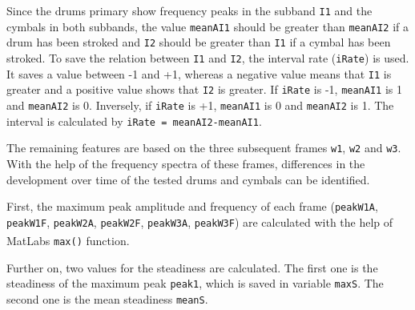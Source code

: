 Since the drums primary show frequency peaks in the subband \lstinline{I1} and the cymbals in both subbands, the value \lstinline{meanAI1} should be greater than \lstinline{meanAI2} if a drum has been stroked and \lstinline{I2} should be greater than \lstinline{I1} if a cymbal has been stroked. To save the relation between \lstinline{I1} and \lstinline{I2}, the interval rate (\lstinline{iRate}) is used. It saves a value between -1 and +1, whereas a negative value means that \lstinline{I1} is greater and a positive value shows that \lstinline{I2} is greater. If \lstinline{iRate} is -1, \lstinline{meanAI1} is 1 and \lstinline{meanAI2} is 0. Inversely, if \lstinline{iRate} is +1, \lstinline{meanAI1} is 0 and \lstinline{meanAI2} is 1. The interval is calculated by \lstinline{iRate = meanAI2-meanAI1}.

The remaining features are based on the three subsequent frames \lstinline{w1}, \lstinline{w2} and \lstinline{w3}. With the help of the frequency spectra of these frames, differences in the development over time of the tested drums and cymbals can be identified. 

First, the maximum peak amplitude and frequency of each frame (\lstinline{peakW1A}, \lstinline{peakW1F}, \lstinline{peakW2A}, \lstinline{peakW2F}, \lstinline{peakW3A}, \lstinline{peakW3F}) are calculated with the help of MatLab\textsuperscript{\textregistered}s \lstinline{max()} function. 

Further on, two values for the steadiness are calculated. The first one is the steadiness of the maximum peak \lstinline{peak1}, which is saved in variable \lstinline{maxS}. The second one is the mean steadiness \lstinline{meanS}.

